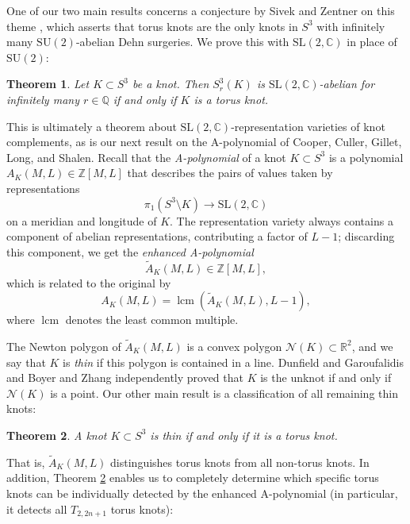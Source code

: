 \documentclass[11pt]{amsart}
\newtheorem {theorem}{Theorem}
\numberwithin{equation}{section}
\numberwithin{theorem}{section}
\theoremstyle{definition}
\newcommand{\Z}{\mathbb{Z}}
\newcommand{\R}{\mathbb{R}}
\newcommand{\C}{\mathbb{C}}
\newcommand{\Q}{\mathbb{Q}}
\newcommand{\cN}{\mathcal{N}}
\newcommand\SU{\mathrm{SU}}
\newcommand\SL{\mathrm{SL}}
\begin{document}
One of our two main results concerns a conjecture by Sivek and Zentner on this theme \cite{sz-pillowcase}, which asserts that  torus knots are the only  knots in $S^3$ with  infinitely many $\SU(2)$-abelian Dehn surgeries. We prove  this with $\SL(2,\C)$ in place of $\SU(2)$:

\begin{theorem}
\label{thm:SLabeliantorus}
Let  $K\subset S^3$ be a knot. Then $S^3_r(K)$ is $\SL(2,\C)$-abelian for infinitely many $r\in \Q$ if and only if $K$ is a torus knot.
\end{theorem}

This is ultimately a theorem about $\SL(2,\C)$-representation varieties of knot complements, as is  our next result  on the A-polynomial of Cooper, Culler, Gillet, Long, and Shalen.  Recall that the \emph{A-polynomial} of a knot $K \subset S^3$ \cite{ccgls} is a  polynomial $A_K(M,L) \in \Z[M,L]$ that describes the pairs of values taken by representations
\[ \pi_1(S^3\setminus K) \to \SL(2,\C) \]
on a meridian and longitude of $K$.  The representation variety always contains a component of abelian representations, contributing a factor of $L-1$; discarding this component, we get the \emph{enhanced A-polynomial}
\[ \tilde{A}_K(M,L) \in \Z[M,L], \] which is related to the original by \begin{equation}\label{eqn:run}A_K(M,L) = \operatorname{lcm}(\tilde{A}_K(M,L), L-1),\end{equation}
where $\operatorname{lcm}$ denotes the least common multiple.

The Newton polygon of $\tilde{A}_K(M,L)$ is a convex polygon $\cN(K)\subset\R^2$, and we say that $K$ is \emph{thin} if this polygon is contained in a line. Dunfield and Garoufalidis \cite{dunfield-garoufalidis} and Boyer and Zhang \cite{boyer-zhang} independently proved that $K$ is the unknot if and only if $\cN(K)$ is a point. Our other main result is a classification of all remaining thin knots:

\begin{theorem} \label{thm:thin-torus}
A knot $K \subset S^3$ is thin if and only if it is a torus knot.
\end{theorem}

That is, $\tilde{A}_K(M,L)$ distinguishes torus knots from all non-torus knots. In addition, Theorem \ref{thm:thin-torus} enables us to completely determine which specific torus knots can be individually detected by the enhanced A-polynomial (in particular, it detects all $T_{2,2n+1}$ torus knots):
\end{document}
